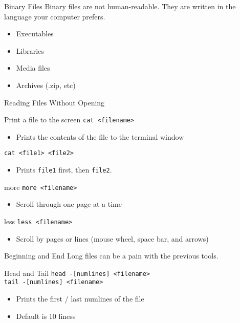 \documentclass[11pt]{beamer}
\newcommand{\colbf}[1]{\textcolor{mLightBrown!77!black}{#1}}%
\begin{document}
\begin{frame}[fragile]{Binary Files}
  Binary files are not human-readable.  They are written in the language your computer prefers.
  \begin{itemize}[<+- | alert@+>]
    \item Executables
    \item Libraries
    \item Media files
    \item Archives (.zip, etc)
  \end{itemize}
\end{frame}

\begin{frame}[fragile]{Reading Files Without Opening}
  \begin{block}{Print a file to the screen}
    \texttt{cat <filename>}
    \begin{itemize}
      \item Prints the contents of the file to the terminal window
    \end{itemize}
    \texttt{cat <file1> <file2>}
    \begin{itemize}
      \item Prints \texttt{file1} first, then \texttt{file2}.
    \end{itemize}
  \end{block}
  \begin{block}{\colbf{more}}
    \texttt{more <filename>}
    \begin{itemize}
      \item Scroll through one page at a time
    \end{itemize}
  \end{block}
  \begin{block}{\colbf{less}}
    \texttt{less <filename>}
    \begin{itemize}
      \item Scroll by pages or lines (mouse wheel, space bar, and arrows)
    \end{itemize}
  \end{block}
\end{frame}

\begin{frame}[fragile]{Beginning and End}
  Long files can be a pain with the previous tools.

  \begin{block}{\colbf{Head} and \colbf{Tail}}
    \texttt{head -[numlines] <filename>}\\
    \texttt{tail -[numlines] <filename>}
    \begin{itemize}
      \item Prints the first / last numlines of the file
      \item Default is 10 liness
    \end{itemize}
  \end{block}
\end{frame}
\end{document}
